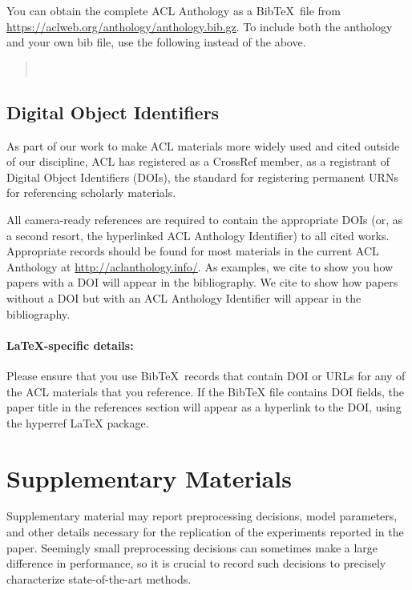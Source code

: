 \documentclass[11pt,a4paper]{article}
\begin{document}
You can obtain the complete ACL Anthology as a Bib\TeX\ file from \url{https://aclweb.org/anthology/anthology.bib.gz}.
To include both the anthology and your own bib file, use the following instead of the above.
\begin{quote}\small
\verb||\\
\verb||
\end{quote}


\subsection{Digital Object Identifiers}
As part of our work to make ACL materials more widely used and cited outside of our discipline, ACL has registered as a CrossRef member, as a registrant of Digital Object Identifiers (DOIs), the standard for registering permanent URNs for referencing scholarly materials.

All camera-ready references are required to contain the appropriate DOIs (or, as a second resort, the hyperlinked ACL Anthology Identifier) to all cited works.
Appropriate records should be found for most materials in the current ACL Anthology at \url{http://aclanthology.info/}.
As examples, we cite \citep{goodman-etal-2016-noise} to show you how papers with a DOI will appear in the bibliography.
We cite \citep{harper-2014-learning} to show how papers without a DOI but with an ACL Anthology Identifier will appear in the bibliography.

\paragraph{\LaTeX-specific details:}
Please ensure that you use Bib\TeX\ records that contain DOI or URLs for any of the ACL materials that you reference.
If the Bib\TeX{} file contains DOI fields, the paper title in the references section will appear as a hyperlink to the DOI, using the hyperref \LaTeX{} package.


\section{Supplementary Materials}
\label{sec:supplementary}

Supplementary material may report preprocessing decisions, model parameters, and other details necessary for the replication of the experiments reported in the paper.
Seemingly small preprocessing decisions can sometimes make a large difference in performance, so it is crucial to record such decisions to precisely characterize state-of-the-art methods. 
\end{document}
